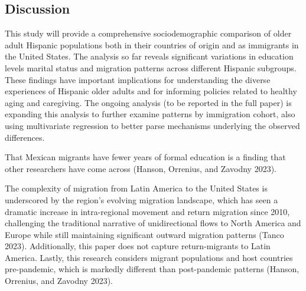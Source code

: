 \documentclass[
]{article}
\begin{document}
\subsection{Discussion}\label{sec-discussion}

This study will provide a comprehensive sociodemographic comparison of
older adult Hispanic populations both in their countries of origin and
as immigrants in the United States. The analysis so far reveals
significant variations in education levels marital status and migration
patterns across different Hispanic subgroups. These findings have
important implications for understanding the diverse experiences of
Hispanic older adults and for informing policies related to healthy
aging and caregiving. The ongoing analysis (to be reported in the full
paper) is expanding this analysis to further examine patterns by
immigration cohort, also using multivariate regression to better parse
mechanisms underlying the observed differences.

That Mexican migrants have fewer years of formal education is a finding
that other researchers have come across (Hanson, Orrenius, and Zavodny
2023).

The complexity of migration from Latin America to the United States is
underscored by the region's evolving migration landscape, which has seen
a dramatic increase in intra-regional movement and return migration
since 2010, challenging the traditional narrative of unidirectional
flows to North America and Europe while still maintaining significant
outward migration patterns (Tanco 2023). Additionally, this paper does
not capture return-migrants to Latin America. Lastly, this research
considers migrant populations and host countries pre-pandemic, which is
markedly different than post-pandemic patterns (Hanson, Orrenius, and
Zavodny 2023).
\end{document}
